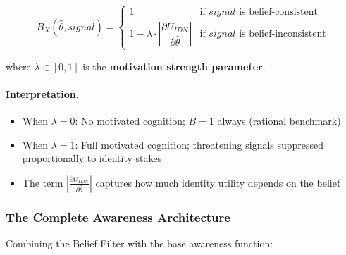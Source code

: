 \begin{equation}
B_X(\hat{\theta}, signal) = 
\begin{cases}
1 & \text{if } signal \text{ is belief-consistent} \\[8pt]
1 - \lambda \cdot \left| \dfrac{\partial U_{IDN}}{\partial \hat{\theta}} \right| & \text{if } signal \text{ is belief-inconsistent}
\end{cases}
\label{eq:belief-filter}
\end{equation}

where $\lambda \in [0,1]$ is the \textbf{motivation strength parameter}.

\paragraph{Interpretation.}
\begin{itemize}
\item When $\lambda = 0$: No motivated cognition; $B = 1$ always (rational benchmark)
\item When $\lambda = 1$: Full motivated cognition; threatening signals suppressed 
      proportionally to identity stakes
\item The term $\left| \frac{\partial U_{IDN}}{\partial \hat{\theta}} \right|$ 
      captures how much identity utility depends on the belief
\end{itemize}

\subsubsection{The Complete Awareness Architecture}
\label{subsubsec:complete-architecture}

Combining the Belief Filter with the base awareness function:


